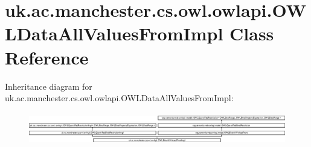 \hypertarget{classuk_1_1ac_1_1manchester_1_1cs_1_1owl_1_1owlapi_1_1_o_w_l_data_all_values_from_impl}{\section{uk.\-ac.\-manchester.\-cs.\-owl.\-owlapi.\-O\-W\-L\-Data\-All\-Values\-From\-Impl Class Reference}
\label{classuk_1_1ac_1_1manchester_1_1cs_1_1owl_1_1owlapi_1_1_o_w_l_data_all_values_from_impl}
}
Inheritance diagram for uk.\-ac.\-manchester.\-cs.\-owl.\-owlapi.\-O\-W\-L\-Data\-All\-Values\-From\-Impl\-:\begin{figure}[H]
\begin{center}
\leavevmode
\includegraphics[height=1.454545cm]{classuk_1_1ac_1_1manchester_1_1cs_1_1owl_1_1owlapi_1_1_o_w_l_data_all_values_from_impl}
\end{center}
\end{figure}
